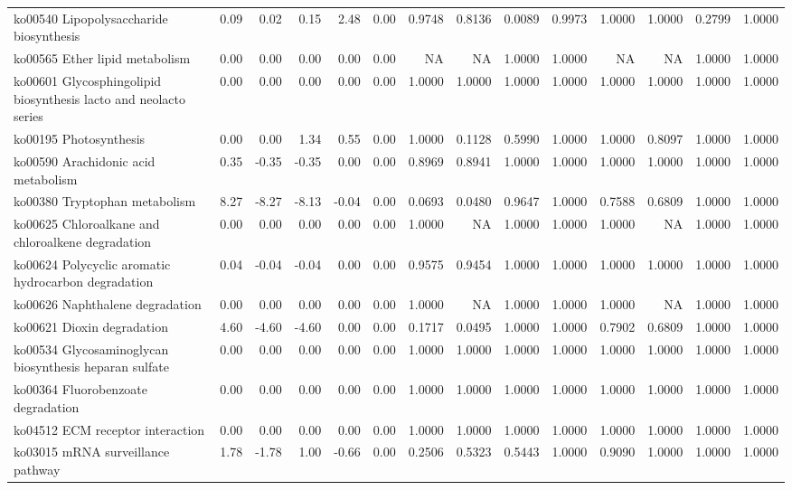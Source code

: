 {\begin{landscape}
\begin{longtable}{ | l | r | r | r | r | r | r  | r | r | r | r | r | r  | r  |}
			ko00540  Lipopolysaccharide biosynthesis & 0.09 & 0.02 & 0.15 & 2.48 & 0.00 & 0.9748 & 0.8136 & 0.0089 & 0.9973 & 1.0000 & 1.0000 & 0.2799 & 1.0000 \\ 
			ko00565  Ether lipid metabolism & 0.00 & 0.00 & 0.00 & 0.00 & 0.00 & NA & NA & 1.0000 & 1.0000 & NA & NA & 1.0000 & 1.0000 \\ 
			ko00601  Glycosphingolipid biosynthesis lacto and neolacto series & 0.00 & 0.00 & 0.00 & 0.00 & 0.00 & 1.0000 & 1.0000 & 1.0000 & 1.0000 & 1.0000 & 1.0000 & 1.0000 & 1.0000 \\ 
			ko00195  Photosynthesis & 0.00 & 0.00 & 1.34 & 0.55 & 0.00 & 1.0000 & 0.1128 & 0.5990 & 1.0000 & 1.0000 & 0.8097 & 1.0000 & 1.0000 \\ 
			ko00590  Arachidonic acid metabolism & 0.35 & -0.35 & -0.35 & 0.00 & 0.00 & 0.8969 & 0.8941 & 1.0000 & 1.0000 & 1.0000 & 1.0000 & 1.0000 & 1.0000 \\ 
			ko00380  Tryptophan metabolism & 8.27 & -8.27 & -8.13 & -0.04 & 0.00 & 0.0693 & 0.0480 & 0.9647 & 1.0000 & 0.7588 & 0.6809 & 1.0000 & 1.0000 \\ 
			ko00625  Chloroalkane and chloroalkene degradation & 0.00 & 0.00 & 0.00 & 0.00 & 0.00 & 1.0000 & NA & 1.0000 & 1.0000 & 1.0000 & NA & 1.0000 & 1.0000 \\ 
			ko00624  Polycyclic aromatic hydrocarbon degradation & 0.04 & -0.04 & -0.04 & 0.00 & 0.00 & 0.9575 & 0.9454 & 1.0000 & 1.0000 & 1.0000 & 1.0000 & 1.0000 & 1.0000 \\ 
			ko00626  Naphthalene degradation & 0.00 & 0.00 & 0.00 & 0.00 & 0.00 & 1.0000 & NA & 1.0000 & 1.0000 & 1.0000 & NA & 1.0000 & 1.0000 \\ 
			ko00621  Dioxin degradation & 4.60 & -4.60 & -4.60 & 0.00 & 0.00 & 0.1717 & 0.0495 & 1.0000 & 1.0000 & 0.7902 & 0.6809 & 1.0000 & 1.0000 \\ 
			ko00534  Glycosaminoglycan biosynthesis heparan sulfate & 0.00 & 0.00 & 0.00 & 0.00 & 0.00 & 1.0000 & 1.0000 & 1.0000 & 1.0000 & 1.0000 & 1.0000 & 1.0000 & 1.0000 \\ 
			ko00364  Fluorobenzoate degradation & 0.00 & 0.00 & 0.00 & 0.00 & 0.00 & 1.0000 & 1.0000 & 1.0000 & 1.0000 & 1.0000 & 1.0000 & 1.0000 & 1.0000 \\ 
			ko04512  ECM receptor interaction & 0.00 & 0.00 & 0.00 & 0.00 & 0.00 & 1.0000 & 1.0000 & 1.0000 & 1.0000 & 1.0000 & 1.0000 & 1.0000 & 1.0000 \\ 
			ko03015  mRNA surveillance pathway & 1.78 & -1.78 & 1.00 & -0.66 & 0.00 & 0.2506 & 0.5323 & 0.5443 & 1.0000 & 0.9090 & 1.0000 & 1.0000 & 1.0000 \\ 

\end{longtable}
\end{landscape}}

